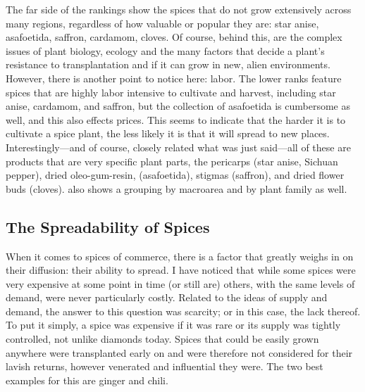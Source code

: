 The far side of the rankings show the spices that do not grow extensively across many regions, regardless of how valuable or popular they are: star anise, asafoetida, saffron, cardamom, cloves. Of course, behind this, are the complex issues of plant biology, ecology and the many factors that decide a plant's resistance to transplantation and if it can grow in new, alien environments. However, there is another point to notice here: labor. The lower ranks feature spices that are highly labor intensive to cultivate and harvest, including star anise, cardamom, and saffron, but the collection of asafoetida is cumbersome as well, and this also effects prices. This seems to indicate that the harder it is to cultivate a spice plant, the less likely it is that it will spread to new places. Interestingly---and of course, closely related what was just said---all of these are products that are very specific plant parts, the pericarps (star anise, Sichuan pepper), dried oleo-gum-resin, (asafoetida), stigmas (saffron), and dried flower buds (cloves).  also shows a grouping by macroarea and by plant family as well.



\subsection{The Spreadability of Spices}
\label{sec:spreadability}

When it comes to spices of commerce, there is a factor that greatly weighs in on their diffusion: their ability to spread. I have noticed that while some spices were very expensive at some point in time (or still are) others, with the same levels of demand, were never particularly costly. Related to the ideas of supply and demand, the answer to this question was scarcity; or in this case, the lack thereof. To put it simply, a spice was expensive if it was rare or its supply was tightly controlled, not unlike diamonds today. Spices that could be easily grown anywhere were transplanted early on and were therefore not considered for their lavish returns, however venerated and influential they were. The two best examples for this are ginger and chili. 

